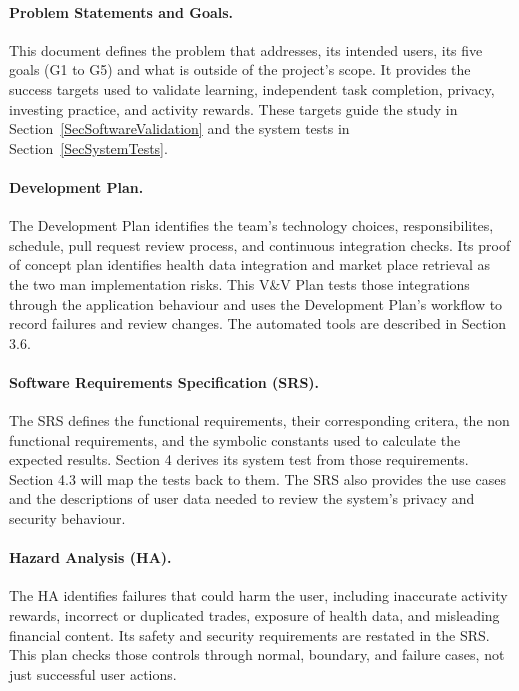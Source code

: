\documentclass[12pt, titlepage]{article}
\begin{document}
\paragraph{Problem Statements and Goals.} This document defines the problem that \progname{} addresses, its intended users, its five goals (G1 to G5) and what is outside of the project's scope. It provides the success targets used to validate learning, independent task completion, privacy, investing practice, and activity rewards. These targets guide the study in Section~\ref{SecSoftwareValidation} and the system tests in Section~\ref{SecSystemTests}.

\paragraph{Development Plan.} The Development Plan identifies the team's technology choices, responsibilites, schedule, pull request review process, and continuous integration checks. Its proof of concept plan identifies health data integration and market place retrieval as the two man implementation risks. This V\&V Plan tests those integrations through the application behaviour and uses the Development Plan's workflow to record failures and review changes. The automated tools are described in Section 3.6.

\paragraph{Software Requirements Specification (SRS).} The SRS defines the functional requirements, their corresponding critera, the non functional requirements, and the symbolic constants used to calculate the expected results. Section 4 derives its system test from those requirements. Section 4.3 will map the tests back to them. The SRS also provides the use cases and the descriptions of user data needed to review the system's privacy and security behaviour.

\paragraph{Hazard Analysis (HA).} The HA identifies failures that could harm the user, including inaccurate activity rewards, incorrect or duplicated trades, exposure of health data, and misleading financial content. Its safety and security requirements are restated in the SRS. This plan checks those controls through normal, boundary, and failure cases, not just successful user actions.
\end{document}
